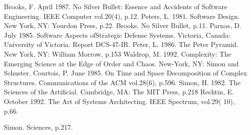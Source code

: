\documentclass[11pt]{article}
\begin{document}
\begin{thebibliography}{99}
 Brooks, F. April 1987. No Silver Bullet: Essence and Accidents of Software Engineering. IEEE Computer vol.20(4), p.12. 
Peters, L. 1981. Software Design. New York, NY: Yourdon Press, p.22. 
Brooks. No Silver Bullet, p.11. 
Parnas, D. July 1985. Software Aspects ofStrategic Defense Systems. Victoria, Canada: University of Victoria. Report DCS-47-IR.
Peter, L. 1986. The Peter Pyramid. New York, NY: William Morrow, p.153
Waldrop, M. 1992. Complexity: The Emerging Science at the Edge of Order and Chaos. New-York, NY: Simon and Schuster. 
Courtois, P. June 1985. On Time and Space Decomposition of Complex Structures. Communications of the ACM vol.28(6), p.596. 
Simon, H. 1982. The Sciences of the Artificial. Cambridge, MA: The MIT Press, p.218
Rechtin, E. October 1992. The Art of Systems Architecting. IEEE Spectrum, vol.29( 10), p.66.

Simon. Sciences, p.217. 

\end{thebibliography}
\end{document}
